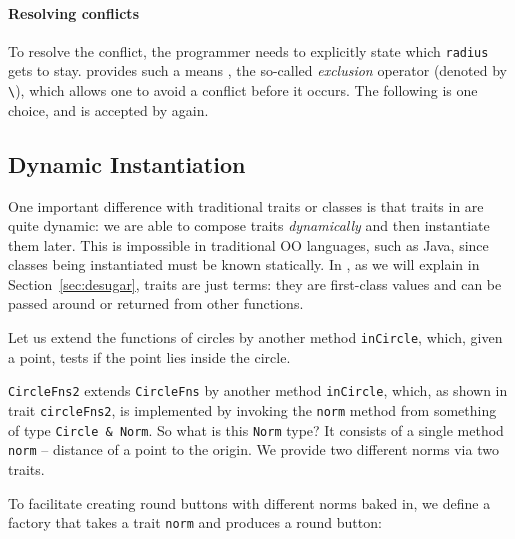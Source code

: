 \paragraph{Resolving conflicts}
To resolve the conflict, the programmer needs to explicitly state which
\lstinline{radius} gets to stay. \name provides such a means , the so-called
\textit{exclusion} operator (denoted by \lstinline{\}), which allows one to
avoid a conflict before it occurs. The following is one choice, and is accepted
by \name again.



\subsection{Dynamic Instantiation}

One important difference with traditional traits or classes is that traits in
\name are quite dynamic: we are able to compose traits \textit{dynamically} and
then instantiate them later. This is impossible in traditional OO languages, such
as Java, since classes being instantiated must be known statically. In \name, as
we will explain in Section~\ref{sec:desugar}, traits are just terms: they are
first-class values and can be passed around or returned from other functions.

Let us extend the functions of circles by another method \lstinline{inCircle},
which, given a point, tests if the point lies inside the circle.

\lstinline{CircleFns2} extends \lstinline{CircleFns} by another method
\lstinline{inCircle}, which, as shown in trait \lstinline{circleFns2}, is
implemented by invoking the \lstinline{norm} method from something of type
\lstinline{Circle & Norm}. So what is this \lstinline{Norm} type? It consists of
a single method \lstinline{norm} -- distance of a point to the origin. We
provide two different norms via two traits.

To facilitate creating round buttons with different norms baked in, we define a
factory that takes a trait \lstinline$norm$ and produces a round button:


